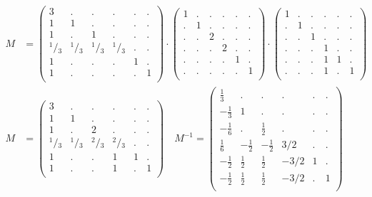 \documentclass[12pt,a4paper]{amsart}
\begin{document}
\scriptsize
\begin{align*}
M &=  
\left(\begin{array}{rrrrrr}%
3&.&.&.&.&.\\%
1&1&.&.&.&.\\%
1&.&1&.&.&.\\%
\!\!\!^1\!/\!_3&\!\!\!^1\!/\!_3&\!\!\!^1\!/\!_3&\!\!\!^1\!/\!_3&.&.\\%
1&.&.&.&1&.\\%
1&.&.&.&.&1\\%
\end{array}\right)%
\cdot 
\left(\begin{array}{rrrrrr}%
1&.&.&.&.&.\\%
.&1&.&.&.&.\\%
.&.&2&.&.&.\\%
.&.&.&2&.&.\\%
.&.&.&.&1&.\\%
.&.&.&.&.&1\\%
\end{array}\right)%
\cdot
\left(\begin{array}{rrrrrr}%
1&.&.&.&.&.\\%
.&1&.&.&.&.\\%
.&.&1&.&.&.\\%
.&.&.&1&.&.\\%
.&.&.&1&1&.\\%
.&.&.&1&.&1\\%
\end{array}\right) \\
M &= 
\left(\begin{array}{rrrrrr}%
3&.&.&.&.&.\\%
1&1&.&.&.&.\\%
1&.&2&.&.&.\\%
\!\!\!^1\!/\!_3&\!\!\!^1\!/\!_3&\!\!\!^2\!/\!_3&\!\!\!^2\!/\!_3&.&.\\%
1&.&.&1&1&.\\%
1&.&.&1&.&1\\%
\end{array}\right)%
\quad
  M^{-1} =
\left(\begin{array}{rrrrrr}%
\frac13&.&.&.&.&.\\%
-\frac13&1&.&.&.&.\\%
-\frac{1}{6}&.&\frac12&.&.&.\\%
\frac{1}{6}&-\frac12&-\frac12&3/2&.&.\\%
-\frac12&\frac12&\frac12&-3/2&1&.\\%
-\frac12&\frac12&\frac12&-3/2&.&1\\%
\end{array}\right)%
\end{align*}
\end{document}
